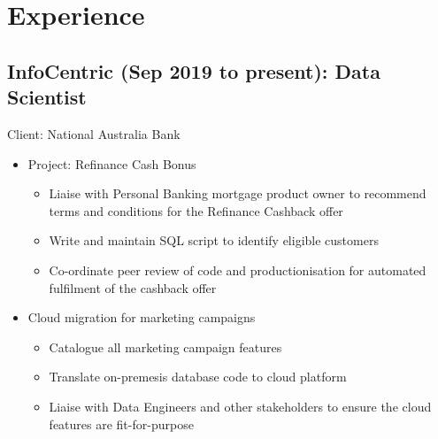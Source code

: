 \documentclass{article}
\begin{document}
\section{Experience}


\subsection{InfoCentric (Sep 2019 to present): Data Scientist}
Client: National Australia Bank
\begin{itemize}
    \item Project: Refinance Cash Bonus
        \begin{itemize}
            \item Liaise with Personal Banking mortgage product owner to recommend terms and conditions for the Refinance Cashback offer
            \item Write and maintain SQL script to identify eligible customers
            \item Co-ordinate peer review of code and productionisation for automated fulfilment of the cashback offer
        \end{itemize}
    \item Cloud migration for marketing campaigns
        \begin{itemize}
            \item Catalogue all marketing campaign features
            \item Translate on-premesis database code to cloud platform
            \item Liaise with Data Engineers and other stakeholders to ensure the cloud features are fit-for-purpose
        \end{itemize}
\end{itemize}
\end{document}
